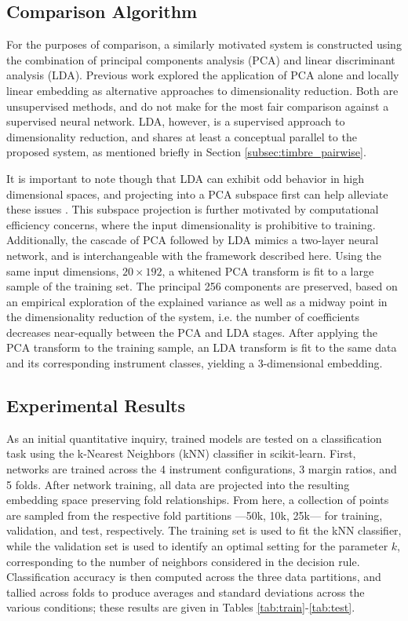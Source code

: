 \subsection{Comparison Algorithm}

For the purposes of comparison, a similarly motivated system is constructed using the combination of principal components analysis (PCA) and linear discriminant analysis (LDA).
Previous work explored the application of PCA alone and locally linear embedding as alternative approaches to dimensionality reduction.
Both are unsupervised methods, and do not make for the most fair comparison against a supervised neural network.
LDA, however, is a supervised approach to dimensionality reduction, and shares at least a conceptual parallel to the proposed system, as mentioned briefly in Section \ref{subsec:timbre_pairwise}.

It is important to note though that LDA can exhibit odd behavior in high dimensional spaces, and projecting into a PCA subspace first can help alleviate these issues \cite{Ji2008Generalized}.
This subspace projection is further motivated by computational efficiency concerns, where the input dimensionality is prohibitive to training.
Additionally, the cascade of PCA followed by LDA mimics a two-layer neural network, and is interchangeable with the framework described here.
Using the same input dimensions, $20\times192$, a whitened PCA transform is fit to a large sample of the training set.
The principal 256 components are preserved, based on an empirical exploration of the explained variance as well as a midway point in the dimensionality reduction of the system, i.e. the number of coefficients decreases near-equally between the PCA and LDA stages.
After applying the PCA transform to the training sample, an LDA transform is fit to the same data and its corresponding instrument classes, yielding a 3-dimensional embedding.


\subsection{Experimental Results}

As an initial quantitative inquiry, trained models are tested on a classification task using the k-Nearest Neighbors (kNN) classifier in scikit-learn\cite{Pedregosa2011Scikit}.
First, networks are trained across the 4 instrument configurations, 3 margin ratios, and 5 folds.
After network training, all data are projected into the resulting embedding space preserving fold relationships.
From here, a collection of points are sampled from the respective fold partitions ---50k, 10k, 25k--- for training, validation, and test, respectively.
The training set is used to fit the kNN classifier, while the validation set is used to identify an optimal setting for the parameter $k$, corresponding to the number of neighbors considered in the decision rule.
Classification accuracy is then computed across the three data partitions, and tallied across folds to produce averages and standard deviations across the various conditions;
these results are given in Tables \ref{tab:train}-\ref{tab:test}.


